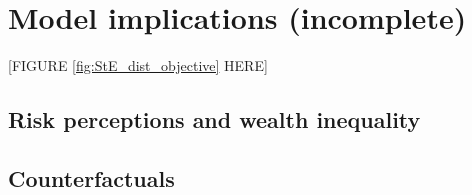 \hypertarget{experiments}{%
\section{Model implications (incomplete)}\label{experiments}}


\begin{center}
[FIGURE \ref{fig:StE_dist_objective} HERE]
\end{center}

\subsection{Risk perceptions and wealth inequality}




\subsection{Counterfactuals }

